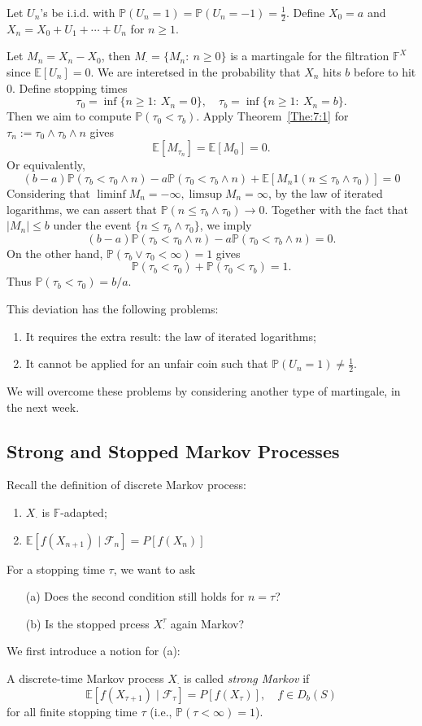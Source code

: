 \begin{example}
Let $U_n$'s be i.i.d. with $\mathbb{P}(U_n=1)=\mathbb{P}(U_n=-1)=\frac{1}{2}$.
Define $X_0=a$ and $X_n=X_0+U_1+\cdots+U_n$ for $n\ge1$.

Let $M_n = X_n-X_0$, then $M_{\cdot}=\{M_n:~n\ge0\}$ is a martingale for the filtration $\mathbb{F}^X$ since $\mathbb{E}[U_n]=0$.
We are interetsed in the probability that $X_n$ hits $b$ before to hit $0$.
Define stopping times
\[
\tau_0=\inf\{n\ge1:~X_n=0\},\quad
\tau_b=\inf\{n\ge1:~X_n=b\}.
\]
Then we aim to compute $\mathbb{P}(\tau_0<\tau_b)$.
Apply Theorem~\ref{The:7:1} for $\tau_n:=\tau_0\land\tau_b\land n$ gives
\[
\mathbb{E}[M_{\tau_n}] = \mathbb{E}[M_{0}]=0.
\]
Or equivalently,
\[
(b-a)\mathbb{P}(\tau_b<\tau_0\land n) - a\mathbb{P}(\tau_0<\tau_b\land n)
+\mathbb{E}[M_n1(n\le\tau_b\land \tau_0)]=0
\]
Considering that $\liminf M_n=-\infty,\limsup M_n=\infty$, by the law of iterated logarithms, we can assert that $\mathbb{P}(n\le\tau_b\land \tau_0)\to0$. Together with the fact that $|M_n|\le b$ under the event $\{n\le\tau_b\land \tau_0\}$, we imply
\[
(b-a)\mathbb{P}(\tau_b<\tau_0\land n) - a\mathbb{P}(\tau_0<\tau_b\land n)=0.
\]
On the other hand, $\mathbb{P}(\tau_b\lor \tau_0<\infty)=1$ gives
\[
\mathbb{P}(\tau_b<\tau_0)+\mathbb{P}(\tau_0<\tau_b)=1.
\]
Thus $\mathbb{P}(\tau_b<\tau_0)=b/a$.
\end{example}
This deviation has the following problems:
\begin{enumerate}
\item
It requires the extra result: the law of iterated logarithms;
\item
It cannot be applied for an unfair coin such that $\mathbb{P}(U_n=1)\ne\frac{1}{2}$.
\end{enumerate}
We will overcome these problems by considering another type of martingale, in the next week.

\subsection{Strong and Stopped Markov Processes}
Recall the definition of discrete Markov process:
\begin{enumerate}
\item
$X_{\cdot}$ is $\mathbb{F}$-adapted;
\item
$\mathbb{E}[f(X_{n+1})\mid\mathcal{F}_n] = P[f(X_n)]$
\end{enumerate}
For a stopping time $\tau$, we want to ask
\begin{enumerate}
\item[(a)]
Does the second condition still holds for $n=\tau$?
\item[(b)]
Is the stopped prcess $X_{\cdot}^{\tau}$ again Markov?
\end{enumerate}
We first introduce a notion for (a):
\begin{definition}
A discrete-time Markov process $X_{\cdot}$ is called \emph{strong Markov} if 
\[
\mathbb{E}[f(X_{\tau+1})\mid\mathcal{F}_\tau] = P[f(X_\tau)],\quad f\in D_b(S)
\]
for all finite stopping time $\tau$ (i.e., $\mathbb{P}(\tau<\infty)=1$).
\end{definition}

